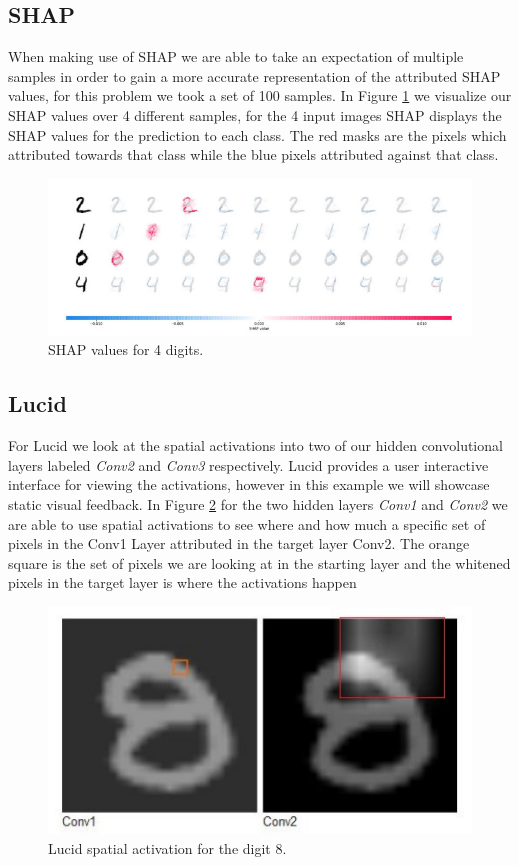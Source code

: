 \subsection{SHAP}
When making use of SHAP we are able to take an expectation of multiple samples in order to gain a more accurate representation of the attributed SHAP values, for this problem we took a set of 100 samples. In Figure \ref{fig:shap-mnist} we visualize our SHAP values over 4 different samples, for the 4 input images SHAP displays the SHAP values for the prediction to each class. The red masks are the pixels which attributed towards that class while the blue pixels attributed against that class.
\begin  {figure}[!htpb]
  \includegraphics[width=\linewidth]{Evaluation_Images/Shap_mnist.jpg}
  \caption{SHAP values for 4 digits.}
  \label{fig:shap-mnist}
\end{figure}

\subsection{Lucid}
For Lucid we look at the spatial activations into two of our hidden convolutional layers labeled \emph{Conv2} and \emph{Conv3} respectively. Lucid provides a user interactive interface for viewing the activations, however in this example we will showcase static visual feedback. In Figure \ref{fig:lucid-mnist} for the two hidden layers \emph{Conv1} and \emph{Conv2} we are able to use spatial activations to see where and how much a specific set of pixels in the Conv1 Layer attributed in the target layer Conv2. The orange square is the set of pixels we are looking at in the starting layer and the whitened pixels in the target layer is where the activations happen

\begin  {figure}[!htpb]
  \includegraphics[width=\linewidth]{Evaluation_Images/Lucid_mnist.jpg}
  \caption{Lucid spatial activation for the digit 8.}
  \label{fig:lucid-mnist}
\end{figure} 

